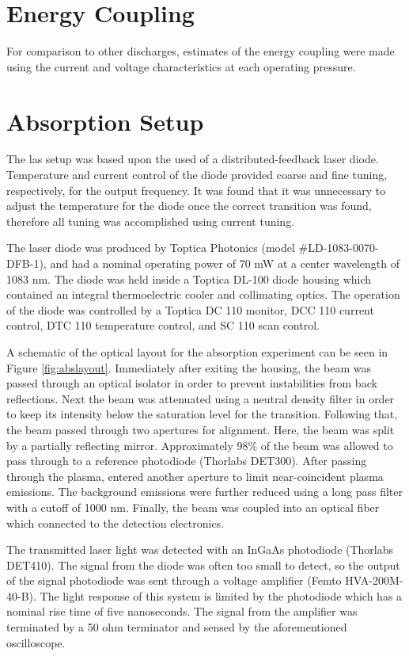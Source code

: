 \section{Energy Coupling}
For comparison to other discharges, estimates of the energy coupling
were made using the current and voltage characteristics at each
operating pressure.

\section{Absorption Setup}
The \acs{las} setup was based upon the used of a distributed-feedback
laser diode. Temperature and current control of the diode provided
coarse and fine tuning, respectively, for the output frequency. It was
found that it was unnecessary to adjust the temperature for the diode
once the correct transition was found, therefore all tuning was
accomplished using current tuning.

The laser diode was produced by Toptica Photonics (model
#LD-1083-0070-DFB-1), and had a nominal operating power of 70 mW at a
center wavelength of 1083 nm. The diode was held inside a Toptica DL-100
diode housing which contained an integral thermoelectric cooler and
collimating optics. The operation of the diode was controlled by a
Toptica DC 110 monitor, DCC 110 current control, DTC 110 temperature
control, and SC 110 scan control.

A schematic of the optical layout for the absorption experiment can be
seen in Figure \ref{fig:abslayout}. Immediately after exiting the
housing, the beam was passed through an optical isolator in order to
prevent instabilities from back reflections. Next the beam was
attenuated using a neutral density filter in order to keep its intensity
below the saturation level for the transition. Following that, the beam
passed through two apertures for alignment. Here, the beam was split by
a partially reflecting mirror. Approximately 98\% of the beam was
allowed to pass through to a reference photodiode (Thorlabs DET300).
After passing through the plasma, entered another aperture to limit
near-coincident plasma emissions. The background emissions were further
reduced using a long pass filter with a cutoff of 1000 nm. Finally, the
beam was coupled into an optical fiber which connected to the detection
electronics.

The transmitted laser light was detected with an InGaAs photodiode
(Thorlabs DET410). The signal from the diode was often too small to
detect, so the output of the signal photodiode was sent through a
voltage amplifier (Femto HVA-200M-40-B). The light response of this
system is limited by the photodiode which has a nominal rise time of
five nanoseconds. The signal from the amplifier was terminated by a 50
ohm terminator and sensed by the aforementioned oscilloscope.

